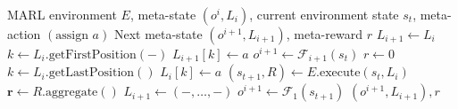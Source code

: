 \documentclass{article}
\begin{document}
\begin{algorithm}
\caption{Supervisor step}
\begin{algorithmic}[1]
\Require MARL environment $E$, meta-state $(o^i, L_i)$, current environment state $s_t$, meta-action $(\text{assign } a)$
\Ensure Next meta-state $(o^{i+1}, L_{i+1})$, meta-reward $r$
        \State $L_{i+1} \gets L_i$
        \State $k \gets L_i.\text{getFirstPosition}(-)$
        \State $L_{i+1}[k] \gets a$
        \State $o^{i+1} \gets \mathcal{F}_{i+1}(s_t)$
        \State $r \gets 0$
    \Else
        \State $k \gets L_i.\text{getLastPosition}()$
        \State $L_i[k] \gets a$
        \State $(s_{t+1}, R) \gets E.\text{execute}(s_t, L_i)$
        \State $\mathbf{r} \gets R.\text{aggregate}()$
        \State $L_{i+1} \gets (-, \ldots, -)$
        \State $o^{i+1} \gets \mathcal{F}_{1}(s_{t+1})$
    \EndIf
    \State \Return $(o^{i+1}, L_{i+1}), r$
\EndProcedure
\end{algorithmic}
\end{algorithm}
\end{document}
